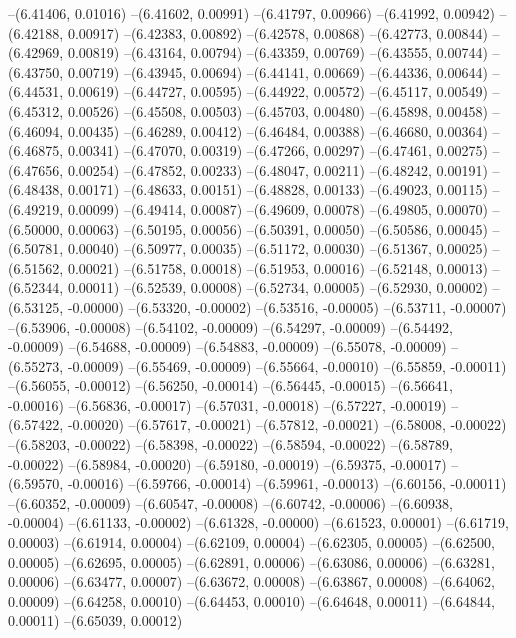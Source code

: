 --(6.41406, 0.01016)
--(6.41602, 0.00991)
--(6.41797, 0.00966)
--(6.41992, 0.00942)
--(6.42188, 0.00917)
--(6.42383, 0.00892)
--(6.42578, 0.00868)
--(6.42773, 0.00844)
--(6.42969, 0.00819)
--(6.43164, 0.00794)
--(6.43359, 0.00769)
--(6.43555, 0.00744)
--(6.43750, 0.00719)
--(6.43945, 0.00694)
--(6.44141, 0.00669)
--(6.44336, 0.00644)
--(6.44531, 0.00619)
--(6.44727, 0.00595)
--(6.44922, 0.00572)
--(6.45117, 0.00549)
--(6.45312, 0.00526)
--(6.45508, 0.00503)
--(6.45703, 0.00480)
--(6.45898, 0.00458)
--(6.46094, 0.00435)
--(6.46289, 0.00412)
--(6.46484, 0.00388)
--(6.46680, 0.00364)
--(6.46875, 0.00341)
--(6.47070, 0.00319)
--(6.47266, 0.00297)
--(6.47461, 0.00275)
--(6.47656, 0.00254)
--(6.47852, 0.00233)
--(6.48047, 0.00211)
--(6.48242, 0.00191)
--(6.48438, 0.00171)
--(6.48633, 0.00151)
--(6.48828, 0.00133)
--(6.49023, 0.00115)
--(6.49219, 0.00099)
--(6.49414, 0.00087)
--(6.49609, 0.00078)
--(6.49805, 0.00070)
--(6.50000, 0.00063)
--(6.50195, 0.00056)
--(6.50391, 0.00050)
--(6.50586, 0.00045)
--(6.50781, 0.00040)
--(6.50977, 0.00035)
--(6.51172, 0.00030)
--(6.51367, 0.00025)
--(6.51562, 0.00021)
--(6.51758, 0.00018)
--(6.51953, 0.00016)
--(6.52148, 0.00013)
--(6.52344, 0.00011)
--(6.52539, 0.00008)
--(6.52734, 0.00005)
--(6.52930, 0.00002)
--(6.53125, -0.00000)
--(6.53320, -0.00002)
--(6.53516, -0.00005)
--(6.53711, -0.00007)
--(6.53906, -0.00008)
--(6.54102, -0.00009)
--(6.54297, -0.00009)
--(6.54492, -0.00009)
--(6.54688, -0.00009)
--(6.54883, -0.00009)
--(6.55078, -0.00009)
--(6.55273, -0.00009)
--(6.55469, -0.00009)
--(6.55664, -0.00010)
--(6.55859, -0.00011)
--(6.56055, -0.00012)
--(6.56250, -0.00014)
--(6.56445, -0.00015)
--(6.56641, -0.00016)
--(6.56836, -0.00017)
--(6.57031, -0.00018)
--(6.57227, -0.00019)
--(6.57422, -0.00020)
--(6.57617, -0.00021)
--(6.57812, -0.00021)
--(6.58008, -0.00022)
--(6.58203, -0.00022)
--(6.58398, -0.00022)
--(6.58594, -0.00022)
--(6.58789, -0.00022)
--(6.58984, -0.00020)
--(6.59180, -0.00019)
--(6.59375, -0.00017)
--(6.59570, -0.00016)
--(6.59766, -0.00014)
--(6.59961, -0.00013)
--(6.60156, -0.00011)
--(6.60352, -0.00009)
--(6.60547, -0.00008)
--(6.60742, -0.00006)
--(6.60938, -0.00004)
--(6.61133, -0.00002)
--(6.61328, -0.00000)
--(6.61523, 0.00001)
--(6.61719, 0.00003)
--(6.61914, 0.00004)
--(6.62109, 0.00004)
--(6.62305, 0.00005)
--(6.62500, 0.00005)
--(6.62695, 0.00005)
--(6.62891, 0.00006)
--(6.63086, 0.00006)
--(6.63281, 0.00006)
--(6.63477, 0.00007)
--(6.63672, 0.00008)
--(6.63867, 0.00008)
--(6.64062, 0.00009)
--(6.64258, 0.00010)
--(6.64453, 0.00010)
--(6.64648, 0.00011)
--(6.64844, 0.00011)
--(6.65039, 0.00012)
